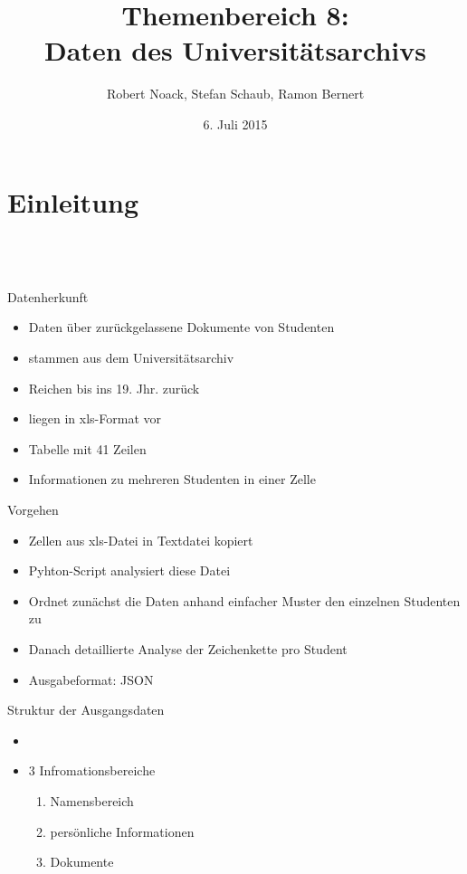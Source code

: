 \documentclass[12pt]{beamer}
\author{Robert Noack, Stefan Schaub, Ramon Bernert}
\title{\textbf{Themenbereich 8: \\Daten des Universitätsarchivs}}
\date{6. Juli 2015}
\begin{document}
\begin{large}
\section*{}
\begin{frame}
\titlepage
\end{frame}

\begin{frame}
\tableofcontents
\end{frame}

\section{Einleitung}
 \subsection*{~}
\begin{frame}{Datenherkunft}
 \begin{itemize}
  \item Daten über zurückgelassene Dokumente von Studenten
  \item stammen aus dem Universitätsarchiv
  \item Reichen bis ins 19. Jhr. zurück
  \item liegen in xls-Format vor
  \item Tabelle mit 41 Zeilen
  \item Informationen zu mehreren Studenten in einer Zelle
 \end{itemize}

\end{frame}


\begin{frame}{Vorgehen}
 \begin{itemize}
  \item Zellen aus xls-Datei in Textdatei kopiert
  \item Pyhton-Script analysiert diese Datei
  \item Ordnet zunächst die Daten anhand einfacher Muster den einzelnen Studenten zu
  \item Danach detaillierte Analyse der Zeichenkette pro Student
  \item Ausgabeformat: JSON
 \end{itemize}
\end{frame}


\begin{frame}{Struktur der Ausgangsdaten}
\begin{itemize}
\item 
\item 3 Infromationsbereiche
 \begin{enumerate}
  \item Namensbereich
  \item persönliche Informationen
  \item Dokumente
 \end{enumerate}
\end{itemize}


\end{frame}
\end{large}
\end{document}
